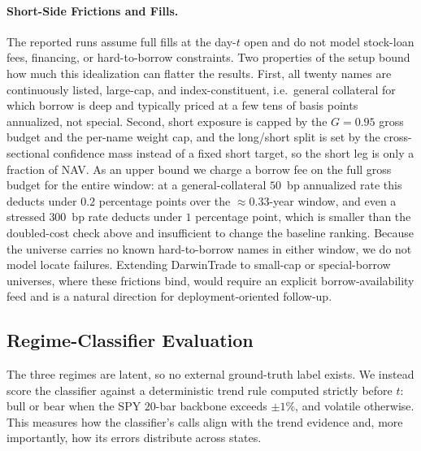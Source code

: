 \documentclass[letterpaper]{article}
\begin{document}
\paragraph{Short-Side Frictions and Fills.}
The reported runs assume full fills at the day-$t$ open and do not model
stock-loan fees, financing, or hard-to-borrow constraints. Two properties of the
setup bound how much this idealization can flatter the results. First, all twenty
names are continuously listed, large-cap, and index-constituent, i.e.\ general
collateral for which borrow is deep and typically priced at a few tens of basis
points annualized, not special. Second, short exposure is capped by the
$G{=}0.95$ gross budget and the per-name weight cap, and the long/short split is set
by the cross-sectional confidence mass instead of a fixed short target, so the
short leg is only a fraction of NAV. As an upper bound we charge a borrow fee on the
full gross budget for the entire window: at a general-collateral $50$~bp annualized
rate this deducts under $0.2$ percentage points over the ${\approx}0.33$-year window,
and even a stressed $300$~bp rate deducts under $1$ percentage point, which is
smaller than
the doubled-cost check above and insufficient to change the baseline ranking. Because
the universe carries no known hard-to-borrow names in either window, we do not model
locate failures. Extending DarwinTrade to small-cap or special-borrow universes,
where these frictions bind, would require an explicit borrow-availability feed and is
a natural direction for deployment-oriented follow-up.

\subsection{Regime-Classifier Evaluation}
\label{app:regime}

The three regimes are latent, so no external ground-truth label exists. We
instead score the classifier against a deterministic trend rule computed
strictly before $t$: bull or bear when the SPY $20$-bar backbone exceeds
$\pm1\%$, and volatile otherwise. This measures how the classifier's calls
align with the trend evidence and, more importantly, how its errors
distribute across states.
\end{document}
